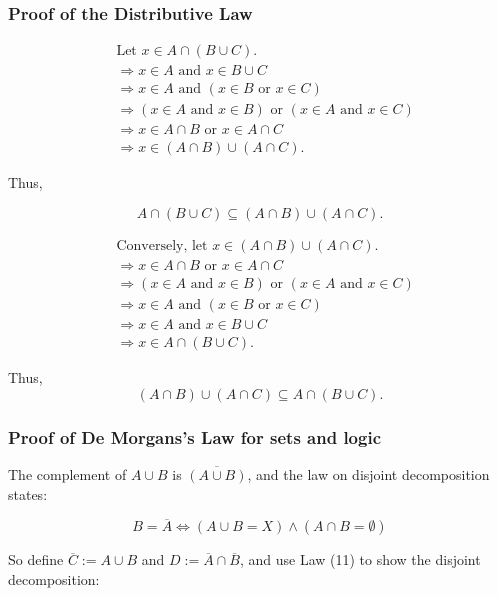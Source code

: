 \subsubsection{Proof of the Distributive Law}

\begin{align*}
	&\text{Let } x \in A \cap (B \cup C). \\
	&\Rightarrow x \in A \text{ and } x \in B \cup C \\
	&\Rightarrow x \in A \text{ and } (x \in B \text{ or } x \in C) \\
	&\Rightarrow (x \in A \text{ and } x \in B) \text{ or } (x \in A \text{ and } x \in C) \\
	&\Rightarrow x \in A \cap B \text{ or } x \in A \cap C \\
	&\Rightarrow x \in (A \cap B) \cup (A \cap C).
\end{align*}

Thus,

\[
	A \cap (B \cup C) \subseteq (A \cap B) \cup (A \cap C).
\]

\begin{align*}
	&\text{Conversely, let } x \in (A \cap B) \cup (A \cap C). \\
	&\Rightarrow x \in A \cap B \text{ or } x \in A \cap C \\
	&\Rightarrow (x \in A \text{ and } x \in B) \text{ or } (x \in A \text{ and } x \in C) \\
	&\Rightarrow x \in A \text{ and } (x \in B \text{ or } x \in C) \\
	&\Rightarrow x \in A \text{ and } x \in B \cup C \\
	&\Rightarrow x \in A \cap (B \cup C).
\end{align*}

Thus,
\[
	(A \cap B) \cup (A \cap C) \subseteq A \cap (B \cup C).
\]

\QED

\subsubsection{Proof of De Morgans's Law for sets and logic}

The complement of \( A \cup B \) is \( \overline{(A \cup B)} \), and the law on disjoint decomposition 
states:

\[
	B = \overline{A} \iff (A \cup B = X) \land (A \cap B = \emptyset)
\]

So define \( \overline{C} := A \cup B \) and \( D := \overline{A} \cap \overline{B} \),
and use Law (11) to show the disjoint decomposition:

